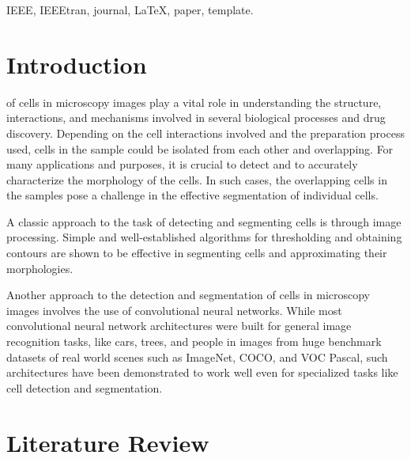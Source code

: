 \documentclass[journal]{IEEEtran}
\begin{document}
\begin{IEEEkeywords}
IEEE, IEEEtran, journal, \LaTeX, paper, template.
\end{IEEEkeywords}






%
\IEEEpeerreviewmaketitle



\section{Introduction}
 of cells in microscopy images play a vital role in understanding the structure, interactions, and mechanisms involved in several 
biological processes and drug discovery. Depending on the cell interactions involved and the preparation process used, cells in the sample could be isolated from each other and overlapping. For many applications and purposes, it is crucial to detect and to accurately characterize the morphology of the cells. In such cases, the overlapping cells in the samples pose a challenge in the effective segmentation of individual cells. 

A classic approach to the task of detecting and segmenting cells is through image processing. Simple and well-established algorithms for thresholding and obtaining contours are shown to be effective in segmenting cells and approximating their morphologies. 

Another approach to the detection and segmentation of cells in microscopy images involves the use of convolutional neural networks. While most convolutional neural network architectures were built for general image recognition tasks, like cars, trees, and people in images from huge benchmark datasets of real world scenes such as ImageNet, COCO, and VOC Pascal, such architectures have been demonstrated to work well even for specialized tasks like cell detection and segmentation. 

\section{Literature Review}
\end{document}
